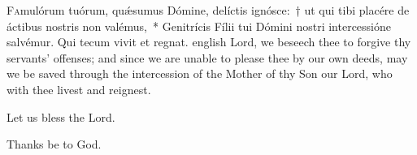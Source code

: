 \documentclass[12pt]{book}
\begin{document}


\texteparacol
{\lettrine{F}{a}mulórum tuórum, quǽsumus Dómine, delí\-ctis ignósce:~† ut qui tibi placére de á\-ctibus nostris non valémus,~* Genitrícis Fílii tui Dómini nostri intercessióne salvémur. Qui tecum vivit et regnat.}
{english}
{\noindent Lord, we beseech thee to forgive thy servants' offenses; and since we are unable to please thee by our own deeds, may we be saved through the intercession of the Mother of thy Son our Lord, who with thee livest and reignest.}

%
%
%
%
%

\myrule




\noindent \vv Let us bless the Lord.

\noindent \rr Thanks be to God.



\end{document}

